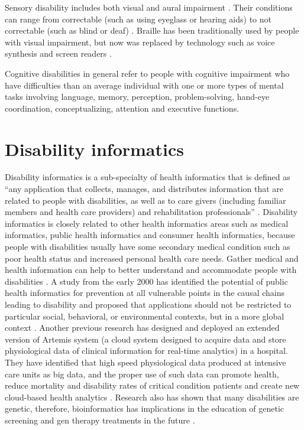 \documentclass[sigconf]{acmart}
\begin{document}
Sensory disability includes both visual and aural impairment \cite{Appleyard2005}. Their conditions can range from correctable (such as using eyeglass or hearing aids) to not correctable (such as blind or deaf) \cite{Riga13}. Braille has been traditionally used by people with visual impairment, but now was replaced by technology such as voice synthesis and screen readers \cite{Riga13}.

Cognitive disabilities in general refer to people with cognitive impairment who have difficulties than an average individual with one or more types of mental tasks involving language, memory, perception, problem-solving, hand-eye coordination, conceptualizing, attention and executive functions\cite{Appleyard2005}. 

\section{Disability informatics}
Disability informatics is a sub-specialty of health informatics that is defined as ``any application that
collects, manages, and distributes information that are related to people with disabilities, as well as to
care givers (including familiar members and health care providers) and rehabilitation professionals''
\cite{Appleyard2005}. Disability informatics is closely related to other health informatics areas such as
medical informatics, public health informatics and consumer health informatics, because people with
disabilities usually have some secondary medical condition such as poor health status and increased
personal health care needs. Gather medical and health information can help to better understand and
accommodate people with disabilities \cite{Riga13}. A study from the early 2000 has identified the
potential of public health informatics for prevention at all vulnerable points in the causal chains leading
to disability and proposed that  applications should not be restricted to particular social, behavioral,
or environmental contexts, but in a more global context \cite{Yasnoff}.  Another previous research has
designed and deployed an extended version of Artemis system (a cloud system designed to acquire data and
store physiological data of clinical information for real-time analytics) in a hospital. They have
identified that high speed physiological data produced at intensive care units as big data, and the proper
use of such data can promote health, reduce mortality and disability rates of critical condition patients
and create new cloud-based health analytics \cite{Khazaei14}. Research also has shown that many
disabilities are genetic, therefore, bioinformatics has implications in the education of genetic screening
and gen therapy treatments in the future \cite{Appleyard2005}.
\end{document}
